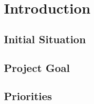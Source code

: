 \section{Introduction}

\subsection{Initial Situation}

\subsection{Project Goal}

\subsection{Priorities}



